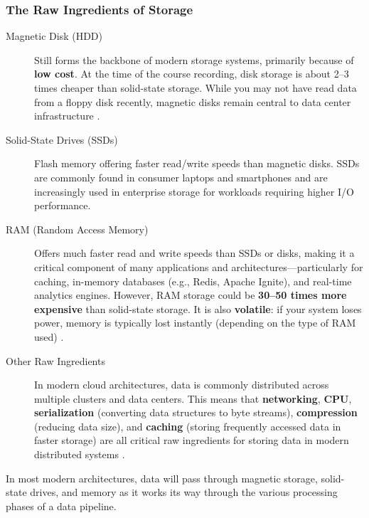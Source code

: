 \documentclass{article}
\begin{document}
\subsubsection{The Raw Ingredients of Storage}
\begin{description}
    \item[Magnetic Disk (HDD)] Still forms the backbone of modern storage systems, primarily because of \textbf{low cost}. At the time of the course recording, disk storage is about 2--3 times cheaper than solid-state storage. While you may not have read data from a floppy disk recently, magnetic disks remain central to data center infrastructure \cite{reis2022fundamentals}.

    \item[Solid-State Drives (SSDs)] Flash memory offering faster read/write speeds than magnetic disks. SSDs are commonly found in consumer laptops and smartphones and are increasingly used in enterprise storage for workloads requiring higher I/O performance.

    \item[RAM (Random Access Memory)] Offers much faster read and write speeds than SSDs or disks, making it a critical component of many applications and architectures---particularly for caching, in-memory databases (e.g., Redis, Apache Ignite), and real-time analytics engines. However, RAM storage could be \textbf{30--50 times more expensive} than solid-state storage. It is also \textbf{volatile}: if your system loses power, memory is typically lost instantly (depending on the type of RAM used) \cite{reis2022fundamentals}.

    \item[Other Raw Ingredients] In modern cloud architectures, data is commonly distributed across multiple clusters and data centers. This means that \textbf{networking}, \textbf{CPU}, \textbf{serialization} (converting data structures to byte streams), \textbf{compression} (reducing data size), and \textbf{caching} (storing frequently accessed data in faster storage) are all critical raw ingredients for storing data in modern distributed systems \cite{kleppmann2017designing}.
\end{description}

In most modern architectures, data will pass through magnetic storage, solid-state drives, and memory as it works its way through the various processing phases of a data pipeline.
\end{document}
